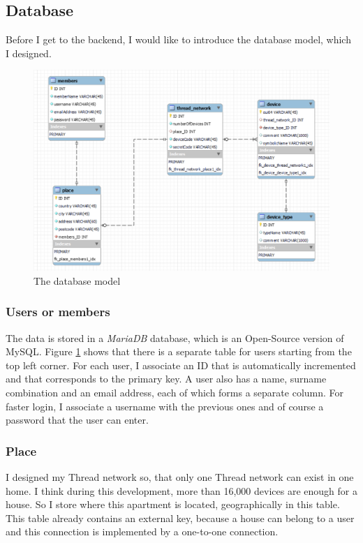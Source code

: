 \subsection{Database}
Before I get to the backend, I would like to introduce the database model, which I designed.
\begin{figure}[!htb]
    \centering
    \includegraphics[width=\textwidth]{img/adatbazis.png}
    \caption{The database model}
    \label{fig:database}
\end{figure}

\subsubsection{Users or members}
The data is stored in a \textit{MariaDB} database, which is an Open-Source version of MySQL. Figure \ref{fig:database} shows that there is a separate table for users starting from the top left corner.
For each user, I associate an ID that is automatically incremented and that corresponds to the primary key. A user also has a name, surname combination and an email address, each of which forms a separate column. For faster login, I associate a username with the previous ones and of course a password that the user can enter.

\subsubsection{Place}
I designed my Thread network so, that only one Thread network can exist in one home. I think during this development, more than 16,000 devices are enough for a house. So I store where this apartment is located, geographically in this table. This table already contains an external key, because a house can belong to a user and this connection is implemented by a one-to-one connection.


